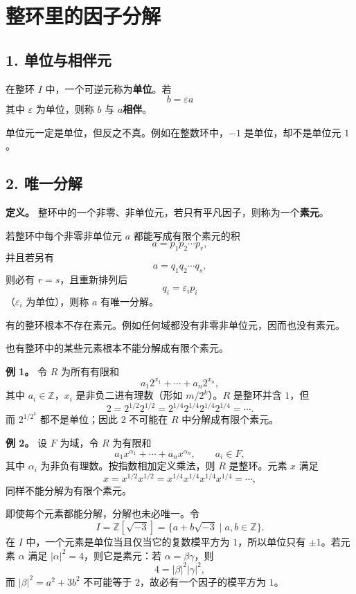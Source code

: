\section{整环里的因子分解}

\subsection*{1. 单位与相伴元}

在整环 $I$ 中，一个可逆元称为\textbf{单位}。若
\[
b=\varepsilon a
\]
其中 $\varepsilon$ 为单位，则称 $b$ 与 $a$\textbf{相伴}。

单位元一定是单位，但反之不真。例如在整数环中，$-1$ 是单位，却不是单位元 $1$。

\subsection*{2. 唯一分解}

\textbf{定义。} 整环中的一个非零、非单位元，若只有平凡因子，则称为一个\textbf{素元}。

若整环中每个非零非单位元 $a$ 都能写成有限个素元的积
\[
a=p_1p_2\cdots p_r,
\]
并且若另有
\[
a=q_1q_2\cdots q_s,
\]
则必有 $r=s$，且重新排列后
\[
q_i=\varepsilon_i p_i
\]
（$\varepsilon_i$ 为单位），则称 $a$ 有唯一分解。

有的整环根本不存在素元。例如任何域都没有非零非单位元，因而也没有素元。

也有整环中的某些元素根本不能分解成有限个素元。

\textbf{例 1。} 令 $R$ 为所有有限和
\[
a_1 2^{x_1}+\cdots+a_n2^{x_n},
\]
其中 $a_i\in\mathbb Z$，$x_i$ 是非负二进有理数（形如 $m/2^k$）。$R$ 是整环并含 $1$，但
\[
2=2^{1/2}2^{1/2}
=2^{1/4}2^{1/4}2^{1/4}2^{1/4}
=\cdots.
\]
而 $2^{1/2^k}$ 都不是单位；因此 $2$ 不可能在 $R$ 中分解成有限个素元。

\textbf{例 2。} 设 $F$ 为域，令 $R$ 为有限和
\[
a_1x^{\alpha_1}+\cdots+a_nx^{\alpha_n},
\qquad a_i\in F,
\]
其中 $\alpha_i$ 为非负有理数。按指数相加定义乘法，则 $R$ 是整环。元素 $x$ 满足
\[
x=x^{1/2}x^{1/2}=x^{1/4}x^{1/4}x^{1/4}x^{1/4}=\cdots,
\]
同样不能分解为有限个素元。

即使每个元素都能分解，分解也未必唯一。令
\[
I=\mathbb Z[\sqrt{-3}]=\{a+b\sqrt{-3}\mid a,b\in\mathbb Z\}.
\]
在 $I$ 中，一个元素是单位当且仅当它的复数模平方为 $1$，所以单位只有 $\pm1$。若元素 $\alpha$ 满足 $|\alpha|^2=4$，则它是素元：若 $\alpha=\beta\gamma$，则
\[
4=|\beta|^2|\gamma|^2,
\]
而 $|\beta|^2=a^2+3b^2$ 不可能等于 $2$，故必有一个因子的模平方为 $1$。

